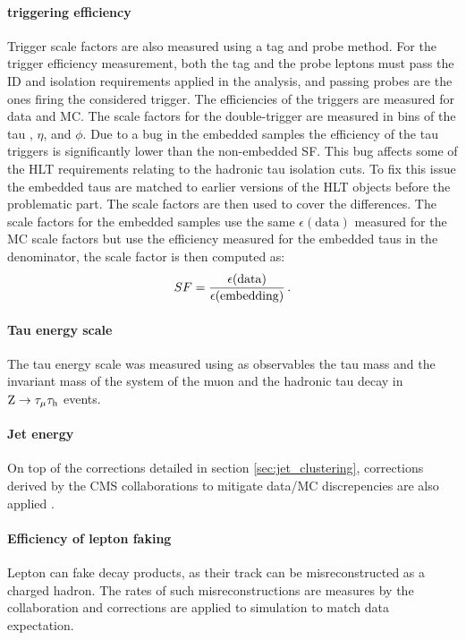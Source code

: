 \paragraph{\tauh triggering efficiency} Trigger scale factors are also measured using a tag and probe method. For the trigger efficiency measurement, both the tag and the probe leptons must pass the ID and isolation requirements applied in the analysis, and passing probes are the ones firing the considered trigger. The efficiencies of the triggers are measured for data and MC. The scale factors for the double-\tauh trigger are measured in bins of the tau \pt, $\eta$, and $\phi$. Due to a bug in the embedded samples the efficiency of the tau triggers is significantly lower than the non-embedded SF. This bug affects some of the HLT requirements relating to the hadronic tau isolation cuts. To fix this issue the embedded taus are matched to earlier versions of the HLT \tauh objects before the problematic part. The scale factors are then used to cover the differences. The scale factors for the embedded samples use the same $\epsilon(\mathrm{data})$ measured for the MC scale factors but use the efficiency measured for the embedded taus in the denominator, the scale factor is then computed as:
\begin{equation}
    SF = \frac{\epsilon(\mathrm{data})}{\epsilon(\mathrm{embedding})} \mend
\end{equation}

\paragraph{Tau energy scale} The tau energy scale was measured using as observables the tau mass and the invariant mass of the system of the muon and the hadronic tau decay in $\mathrm{Z}\rightarrow\tau_{\mu}\tau_{\rm h}$ events. 

\paragraph{Jet energy} On top of the corrections detailed in section \ref{sec:jet_clustering}, corrections derived by the CMS collaborations to mitigate data/MC discrepencies are also applied \cite{collaboration_2011}.

\paragraph{Efficiency of lepton faking \tauh} Lepton can fake \tauh decay products, as their track can be misreconstructed as a charged hadron. The rates of such misreconstructions are measures by the collaboration and corrections are applied to simulation to match data expectation.

